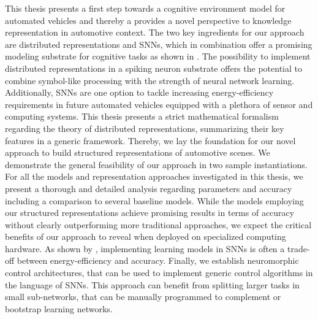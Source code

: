 This thesis presents a first step towards a cognitive environment model for automated vehicles and thereby a provides a novel perspective to knowledge representation in automotive context.
The two key ingredients for our approach are distributed representations and \acp{SNN}, which in combination offer a promising modeling substrate for cognitive tasks as shown in \textcite{Eliasmith2013, Eliasmith2012}. 
The possibility to implement distributed representations in a spiking neuron substrate offers the potential to combine symbol-like processing with the strength of neural network learning.
Additionally, \acp{SNN} are one option to tackle increasing energy-efficiency requirements in future automated vehicles equipped with a plethora of sensor and computing systems.
This thesis presents a strict mathematical formalism regarding the theory of distributed representations, summarizing their key features in a generic framework.
Thereby, we lay the foundation for our novel approach to build structured representations of automotive scenes.
We demonstrate the general feasibility of our approach in two sample instantiations.
For all the models and representation approaches investigated in this thesis, we present a thorough and detailed analysis regarding parameters and accuracy including a comparison to several baseline models.
While the models employing our structured representations achieve promising results in terms of accuracy without clearly outperforming more traditional approaches, we expect the critical benefits of our approach to reveal when deployed on specialized computing hardware. 
As shown by \textcite{Hunsberger2016}, implementing learning models in \acp{SNN} is often a trade-off between energy-efficiency and accuracy.
Finally, we establish neuromorphic control architectures, that can be used to implement generic control algorithms in the language of \acp{SNN}.
This approach can benefit from splitting larger tasks in small sub-networks, that can be manually programmed to complement or bootstrap learning networks.

